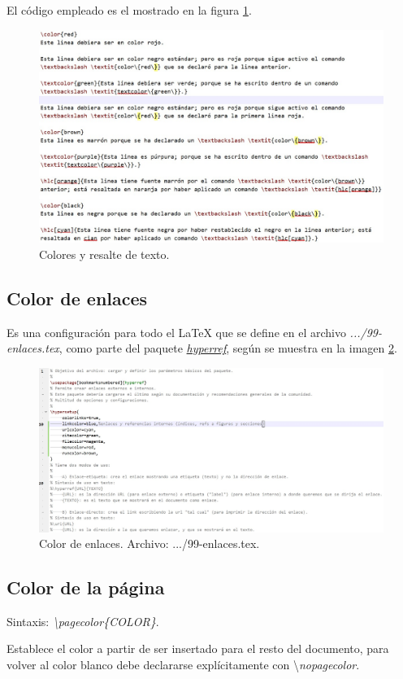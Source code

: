 El código empleado es el mostrado en la figura \ref{fig:colores-codigo}.
\begin{figure}[h]
	\centering
	\includegraphics[width=1\linewidth, frame]{cuerpo/cap-redaccion/imagenes/colores-codigo}
	\caption[Colores y resalte de texto.]{Colores y resalte de texto.}
	\label{fig:colores-codigo}
\end{figure}
%
\subsection{Color de enlaces}
Es una configuración para todo el \LaTeX{} que se define en el archivo \textit{.../99-enlaces.tex}, como parte del paquete \href{https://www.ctan.org/pkg/hyperref}{\textit{hyperref}}, según se muestra en la imagen \ref{fig:color-enlaces}.
\begin{figure}[H]
	\centering
	\includegraphics[width=1\linewidth, frame]{cuerpo/cap-redaccion/imagenes/color-enlaces}
	\caption[Color de enlaces.]{Color de enlaces. Archivo: .../99-enlaces.tex.}
	\label{fig:color-enlaces}
\end{figure}
%
\subsection{Color de la página}
Sintaxis: \textit{\textbackslash pagecolor\{COLOR\}}.

Establece el color a partir de ser insertado para el resto del documento, para volver al color blanco debe declararse explícitamente con \textbackslash\textit{nopagecolor}.